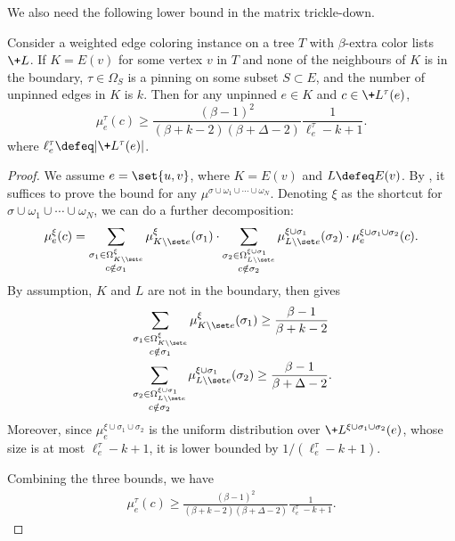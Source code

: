 We also need the following lower bound in the matrix trickle-down.
\begin{lemma}\label{lem:marginal-lower-weighted}
    Consider a weighted edge coloring instance on a tree $T$ with $\beta$-extra
    color lists $\+L$.
    If $K=E(v)$ for some vertex $v$ in $T$ and none of the neighbours of $K$ is in the boundary,
    $\tau\in \Omega_S$ is a pinning on some subset $S \subset E$, and the number of 
    unpinned edges in $K$ is $k$. Then for any unpinned $e\in K$ and $c\in \+L^\tau(e)$,
    \[
    \mu^{\tau}_e(c) \ge \frac{(\beta-1)^2}{(\beta+k-2)(\beta+\Delta-2)}\frac{1}{\ell_e^\tau-k+1}.
    \]
    where $\ell^\tau_e\defeq|\+L^\tau(e)|$.
\end{lemma}
\begin{proof}
    We assume $e = \set{u, v}$, where $K=E(v)$ and $L\defeq E(v)$.
    By ,
    it suffices to prove the bound for any $\mu^{\sigma\cup\omega_1\cup\cdots\cup\omega_N}$.
    Denoting $\xi$ as the shortcut for $\sigma\cup\omega_1\cup\cdots\cup\omega_N$,
    we can do a further decomposition:
    \begin{align*}
        \mu^{\xi}_e(c) =
        \sum_{\substack{\sigma_1\in\Omega^{\xi            }_{K\setminus\set e}\\ c\notin \sigma_1}}
        \mu^{\xi                        }_{K\setminus\set e}(\sigma_1)\cdot
        \sum_{\substack{\sigma_2\in\Omega^{\xi\cup\sigma_1}_{L\setminus\set e}\\ c\notin \sigma_2}}
        \mu^{\xi\cup\sigma_1            }_{L\setminus\set e}(\sigma_2)\cdot
        \mu^{\xi\cup\sigma_1\cup\sigma_2}_e(c).
    \end{align*}
    By assumption, $K$ and $L$ are not in the boundary, then 
    gives%
    \begin{align*}
       &\sum_{\substack{\sigma_1\in\Omega^{\xi            }_{K\setminus\set e}\\ c\notin \sigma_1}}
        \mu^{\xi                        }_{K\setminus\set e}(\sigma_1)
        \ge \frac{\beta-1}{\beta + k - 2}
     \\&\sum_{\substack{\sigma_2\in\Omega^{\xi\cup\sigma_1}_{L\setminus\set e}\\ c\notin \sigma_2}}
        \mu^{\xi\cup\sigma_1            }_{L\setminus\set e}(\sigma_2)
        \ge \frac{\beta-1}{\beta + \Delta - 2}.
    \end{align*}
    Moreover, since $\mu^{\xi\cup\sigma_1\cup\sigma_2}_e$ is the uniform distribution
    over $\+L^{\xi\cup\sigma_1\cup\sigma_2}(e)$, whose size is at most $\ell_e^{\tau}-k+1$, it is
    lower bounded by $1/(\ell_e^{\tau}-k+1)$.

    Combining the three bounds, we have
    \begin{align*}
        \mu^{\tau}_e(c) \ge \frac{(\beta-1)^2}{(\beta+k-2)(\beta+\Delta-2)}\frac{1}{\ell_e^\tau-k+1}.
    \end{align*}
\end{proof}

